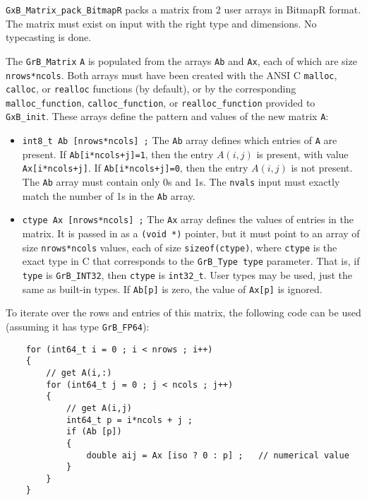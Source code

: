\documentclass[12pt]{article}
\begin{document}
\verb'GxB_Matrix_pack_BitmapR' packs a matrix from 2 user arrays in BitmapR
format.
The matrix must exist on input with the right type and dimensions.  No typecasting is done.

The \verb'GrB_Matrix' \verb'A' is populated from the arrays \verb'Ab' and
\verb'Ax', each of which are size \verb'nrows*ncols'.  Both arrays must have
been created with the ANSI C \verb'malloc', \verb'calloc', or \verb'realloc'
functions (by default), or by the corresponding \verb'malloc_function',
\verb'calloc_function', or \verb'realloc_function' provided to \verb'GxB_init'.
These arrays define the pattern and values of the new matrix \verb'A':

\begin{itemize}
\item \verb'int8_t Ab [nrows*ncols] ;'  The \verb'Ab' array defines which
entries of \verb'A' are present.  If \verb'Ab[i*ncols+j]=1', then the entry
$A(i,j)$ is present, with value \verb'Ax[i*ncols+j]'.  If
\verb'Ab[i*ncols+j]=0', then the entry $A(i,j)$ is not present.  The \verb'Ab'
array must contain only 0s and 1s.  The \verb'nvals' input must exactly match
the number of 1s in the \verb'Ab' array.

\item \verb'ctype Ax [nrows*ncols] ;'  The \verb'Ax' array defines the values
of entries in the matrix.  It is passed in as a \verb'(void *)' pointer, but it
must point to an array of size \verb'nrows*ncols' values, each of size
\verb'sizeof(ctype)', where \verb'ctype' is the exact type in C that
corresponds to the \verb'GrB_Type type' parameter.  That is, if \verb'type' is
\verb'GrB_INT32', then \verb'ctype' is \verb'int32_t'.  User types may be used,
just the same as built-in types.
If \verb'Ab[p]' is zero, the value of \verb'Ax[p]' is ignored.

\end{itemize}

To iterate over the rows and entries of this matrix, the following code can be
used (assuming it has type \verb'GrB_FP64'):

    {\footnotesize
    \begin{verbatim}
    for (int64_t i = 0 ; i < nrows ; i++)
    {
        // get A(i,:)
        for (int64_t j = 0 ; j < ncols ; j++)
        {
            // get A(i,j)
            int64_t p = i*ncols + j ;
            if (Ab [p])
            {
                double aij = Ax [iso ? 0 : p] ;   // numerical value
            }
        }
    } \end{verbatim}}
\end{document}
